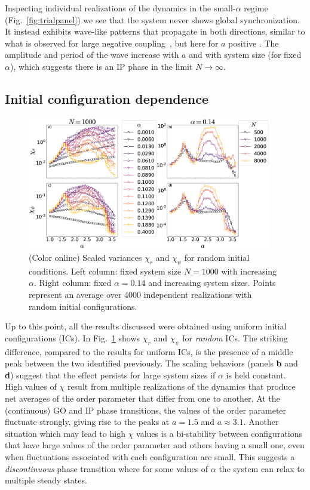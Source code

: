 Inspecting individual realizations of the dynamics in the small-$\alpha$ regime (Fig.~\ref{fig:trialpanel}) we see that the system
never shows global synchronization. It instead exhibits wave-like patterns that propagate in both directions, similar to what is
observed for large negative coupling~\cite{escaff2014arrays}, but here for $a$ positive . The amplitude and period of the wave increase
with $a$ and with system size (for fixed $\alpha$), which suggests there is an IP phase in the limit $N\to\infty$.

\subsection{Initial configuration dependence}

\begin{figure}[b]
\begin{center}
    \includegraphics[width=0.95\textwidth]{fig/chi_curves_randomic.eps}
\caption{\label{fig:chicurvesrandom} (Color online) Scaled variances $\chi_r$ and $\chi_{\psi}$ for random initial conditions.  Left
column: fixed system size $N=1000$ with increasing $\alpha$.  Right column: fixed $\alpha=0.14$ and increasing system sizes.  Points
represent an average over 4000 independent realizations with random initial configurations.}
\end{center}
\end{figure}

Up to this point, all the results discussed were obtained using uniform initial configurations (ICs).  In
Fig.~\ref{fig:chicurvesrandom} shows $\chi_r$ and $\chi_{\psi}$ for \textit{random} ICs. The striking difference, compared to the results
for uniform ICs, is the presence of a middle peak between the two identified previously. The scaling behaviors (panels \textbf{b} and
\textbf{d}) suggest that the effect persists for large system sizes if $\alpha$ is held constant. High values of $\chi$ result from
multiple realizations of the dynamics that produce net averages of the order parameter that differ from one to another. At the
(continuous) GO and IP phase transitions, the values of the order parameter fluctuate strongly, giving rise to the peaks at $a=1.5$ and
$a\approx 3.1$. Another situation which may lead to high $\chi$ values is a bi-stability between configurations that have large values
of the order parameter and others having a small one, even when fluctuations associated with each configuration are small. This
suggests a \textit{discontinuous} phase transition where for some values of $\alpha$ the system can relax to multiple steady states. 

